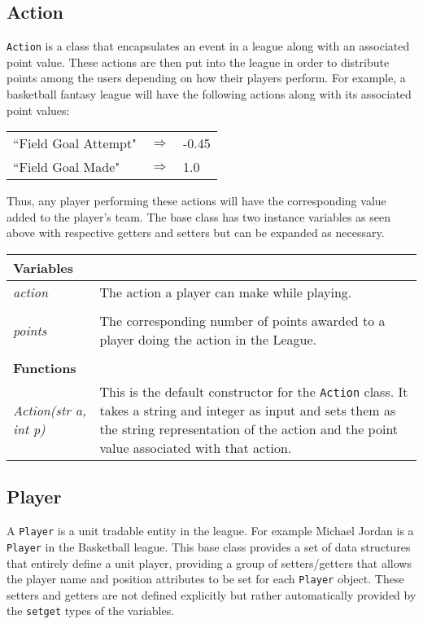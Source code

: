 \documentclass[12pt]{report}
\begin{document}
\subsection{Action}
\begin{doublespace}
\texttt{Action} is a class that encapsulates an event in a league along with an associated point value. These actions are then put into the league in order to distribute points among the users depending on how their players perform. For example, a basketball fantasy league will have the following actions along with its associated point values:
\begin{center}
\begin{tabular}{ l c l }
``Field Goal Attempt" & $\Rightarrow$ & -0.45 \\
``Field Goal Made" & $\Rightarrow$ & 1.0
\end{tabular}
\end{center}
Thus, any player performing these actions will have the corresponding value added to the player's team. The base class has two instance variables as seen above with respective getters and setters but can be expanded as necessary.

\begin{flushleft}
\begin{onehalfspace}
\begin{tabular}{ l | p{12cm} }
\hline
\textbf{Variables} & \\
\hline
\textit{action} & The action a player can make while playing. \\
\\
\textit{points} & The corresponding number of points awarded to a player doing the action in the League. \\
\\
\hline
\textbf{Functions} & \\
\hline
\textit{Action(str a, int p)} & This is the default constructor for the \texttt{Action} class. It takes a string and integer as input and sets them as the string representation of the action and the point value associated with that action. \\
\hline
\end{tabular}
\end{onehalfspace}
\end{flushleft}

\subsection{Player}
A \texttt{Player} is a unit tradable entity in the league. For example Michael Jordan is a \texttt{Player} in the Basketball league. This base class provides a set of data structures that entirely define a unit player, providing a group of setters/getters that allows the player name and position attributes to be set for each \texttt{Player} object. These setters and getters are not defined explicitly but rather automatically provided by the \texttt{setget} types of the variables.


\end{doublespace}
\end{document}
